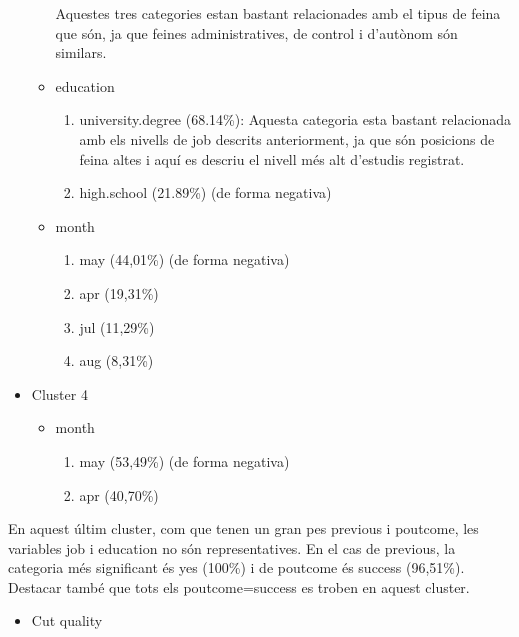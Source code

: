 \documentclass[
]{article}
\providecommand{\tightlist}{%
  \setlength{\itemsep}{0pt}\setlength{\parskip}{0pt}}
\begin{document}
\begin{itemize}
\begin{itemize}
    Aquestes tres categories estan bastant relacionades amb el tipus de
    feina que són, ja que feines administratives, de control i d'autònom
    són similars.
  \item
    education

    \begin{enumerate}
    \def\labelenumi{\arabic{enumi}.}
    \item
      university.degree (68.14\%): Aquesta categoria esta bastant
      relacionada amb els nivells de job descrits anteriorment, ja que
      són posicions de feina altes i aquí es descriu el nivell més alt
      d'estudis registrat.
    \item
      high.school (21.89\%) (de forma negativa)
    \end{enumerate}
  \item
    month

    \begin{enumerate}
    \def\labelenumi{\arabic{enumi}.}
    \item
      may (44,01\%) (de forma negativa)
    \item
      apr (19,31\%)
    \item
      jul (11,29\%)
    \item
      aug (8,31\%)
    \end{enumerate}
  \end{itemize}
\item
  Cluster 4

  \begin{itemize}
  \item
    month

    \begin{enumerate}
    \def\labelenumi{\arabic{enumi}.}
    \item
      may (53,49\%) (de forma negativa)
    \item
      apr (40,70\%)
    \end{enumerate}
  \end{itemize}
\end{itemize}

En aquest últim cluster, com que tenen un gran pes previous i poutcome,
les variables job i education no són representatives. En el cas de
previous, la categoria més significant és yes (100\%) i de poutcome és
success (96,51\%). Destacar també que tots els poutcome=success es
troben en aquest cluster.

\begin{itemize}
\tightlist
\item
  Cut quality
\end{itemize}
\end{document}
